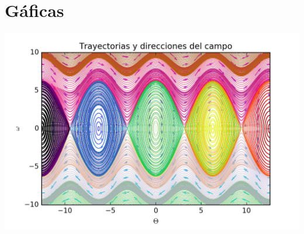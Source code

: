 \documentclass[11pt,spanish]{article}
\begin{document}
\section*{Gáficas}

\centering

\includegraphics[scale=1.3]{fase}\\
\end{document}
